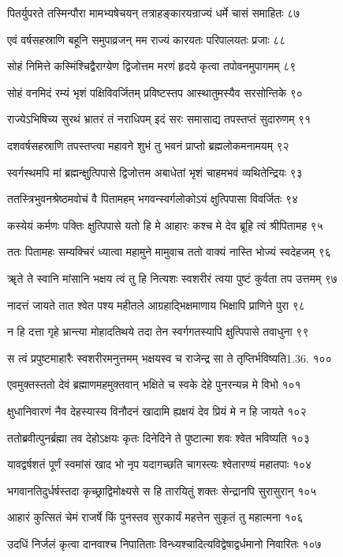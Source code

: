 पितर्युपरते तस्मिन्पौरा मामभ्यषेचयन्
तत्राहङ्कारयन्राज्यं धर्मे चासं समाहितः ८७

एवं वर्षसहस्राणि बहूनि समुपाव्रजन्
मम राज्यं कारयतः परिपालयतः प्रजाः ८८

सोहं निमित्ते कस्मिंश्चिद्वैराग्येण द्विजोत्तम
मरणं हृदये कृत्वा तपोवनमुपागमम् ८९

सोहं वनमिदं रम्यं भृशं पक्षिविवर्जितम्
प्रविष्टस्तप आस्थातुमस्यैव सरसोन्तिके ९०

राज्येऽभिषिच्य सुरथं भ्रातरं तं नराधिपम्
इदं सरः समासाद्य तपस्तप्तं सुदारुणम् ९१

दशवर्षसहस्राणि तपस्तप्त्वा महावने
शुभं तु भवनं प्राप्तो ब्रह्मलोकमनामयम् ९२

स्वर्गस्थमपि मां ब्रह्मन्क्षुत्पिपासे द्विजोत्तम
अबाधेतां भृशं चाहमभवं व्यथितेन्द्रियः ९३

ततस्त्रिभुवनश्रेष्ठमवोचं वै पितामहम्
भगवन्स्वर्गलोकोऽयं क्षुत्पिपासा विवर्जितः ९४

कस्येयं कर्मणः पक्तिः क्षुत्पिपासे यतो हि मे
आहारः कश्च मे देव ब्रूहि त्वं श्रीपितामह ९५

ततः पितामहः सम्यक्चिरं ध्यात्वा महामुने
मामुवाच ततो वाक्यं नास्ति भोज्यं स्वदेहजम् ९६

ॠते ते स्वानि मांसानि भक्षय त्वं तु हि नित्यशः
स्वशरीरं त्वया पुष्टं कुर्वता तप उत्तमम् ९७

नादत्तं जायते तात श्वेत पश्य महीतले
आग्रहाद्भिक्षमाणाय भिक्षापि प्राणिने पुरा ९८

न हि दत्ता गृहे भ्रान्त्या मोहादतिथये तदा
तेन स्वर्गगतस्यापि क्षुत्पिपासे तवाधुना ९९

स त्वं प्रपुष्टमाहारैः स्वशरीरमनुत्तमम्
भक्षयस्व च राजेन्द्र सा ते तृप्तिर्भविष्यति1.36. १००

एवमुक्तस्ततो देवं ब्रह्माणमहमुक्तवान्
भक्षिते च स्वके देहे पुनरन्यन्न मे विभो १०१

क्षुधानिवारणं नैव देहस्यास्य विनौदनं
खादामि ह्यक्षयं देव प्रियं मे न हि जायते १०२

ततोब्रवीत्पुनर्ब्रह्मा तव देहोऽक्षयः कृतः
दिनेदिने ते पुष्टात्मा शवः श्वेत भविष्यति १०३

यावद्वर्षशतं पूर्णं स्वमांसं खाद भो नृप
यदागच्छति चागस्त्यः श्वेतारण्यं महातपाः १०४

भगवानतिदुर्धर्षस्तदा कृच्छ्राद्विमोक्ष्यसे
स हि तारयितुं शक्तः सेन्द्रानपि सुरासुरान् १०५

आहारं कुत्सितं चेमं राजर्षे किं पुनस्तव
सुरकार्यं महत्तेन सुकृतं तु महात्मना १०६

उदधिं निर्जलं कृत्वा दानवाश्च निपातिताः
विन्ध्यश्चादित्यविद्वेषाद्वर्धमानो निवारितः १०७

